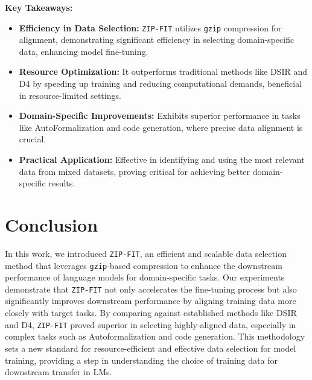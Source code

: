 \begin{mdframed}[backgroundcolor=blue!10, linecolor=blue!50!black, linewidth=2pt, innertopmargin=\baselineskip, innerbottommargin=\baselineskip, innerrightmargin=20pt, innerleftmargin=20pt, roundcorner=10pt]
\textbf{Key Takeaways:}
\begin{itemize}
    \item \textbf{Efficiency in Data Selection:} \texttt{ZIP-FIT} utilizes \texttt{gzip} compression for alignment, demonstrating significant efficiency in selecting domain-specific data, enhancing model fine-tuning.
    \item \textbf{Resource Optimization:} It outperforms traditional methods like DSIR and D4 by speeding up training and reducing computational demands, beneficial in resource-limited settings.
    \item \textbf{Domain-Specific Improvements:} Exhibits superior performance in tasks like AutoFormalization and code generation, where precise data alignment is crucial.
    \item \textbf{Practical Application:} Effective in identifying and using the most relevant data from mixed datasets, proving critical for achieving better domain-specific results.
\end{itemize}
\end{mdframed}

\section{Conclusion}

In this work, we introduced \texttt{ZIP-FIT}, an efficient and scalable data selection method that leverages \texttt{gzip}-based compression to enhance the downstream performance of language models for domain-specific tasks. Our experiments demonstrate that \texttt{ZIP-FIT} not only accelerates the fine-tuning process but also significantly improves downstream performance by aligning training data more closely with target tasks. By comparing against established methods like DSIR and D4, \texttt{ZIP-FIT} proved superior in selecting highly-aligned data, especially in complex tasks such as Autoformalization and code generation. This methodology sets a new standard for resource-efficient and effective data selection for model training, providing a step in understanding the choice of training
data for downstream transfer in LMs.



